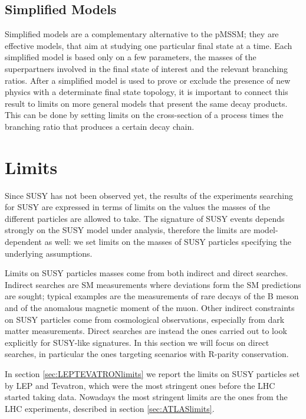 \subsection{Simplified Models}

Simplified models \cite{Alves:simplifiedmodels} are a complementary alternative to the pMSSM; they are effective models, that aim at studying one particular final state at a time. Each simplified model is based only on a few parameters, the masses of the superpartners involved in the final state of interest and the relevant branching ratios. After a simplified model is used to prove or exclude the presence of new physics with a determinate final state topology, it is important to connect this result to limits on more general models that present the same decay products. This can be done by setting limits on the cross-section of a process times the branching ratio that produces a certain decay chain.




\section{Limits}

Since SUSY has not been observed yet, the results of the experiments searching for SUSY are expressed in terms of limits on the values the masses of the different particles are allowed to take. The signature of SUSY events depends strongly on the SUSY model under analysis, therefore the limits are model-dependent as well: we set limits on the masses of SUSY particles specifying the underlying assumptions.

Limits on SUSY particles masses come from both indirect and direct searches. Indirect searches are SM measurements where deviations form the SM predictions are sought; typical examples are the measurements of rare decays of the B meson and of the anomalous magnetic moment of the muon. Other indirect constraints on SUSY particles come from cosmological observations, especially from dark matter measurements. Direct searches are instead the ones carried out to look explicitly for SUSY-like signatures. In this section we will focus on direct searches, in particular the ones targeting scenarios with R-parity conservation.

In section \ref{sec:LEPTEVATRONlimits} we report the limits on SUSY particles set by LEP and Tevatron, which were the most stringent ones before the LHC started taking data. Nowadays the most stringent limits are the ones from the LHC experiments, described in section \ref{sec:ATLASlimits}.

